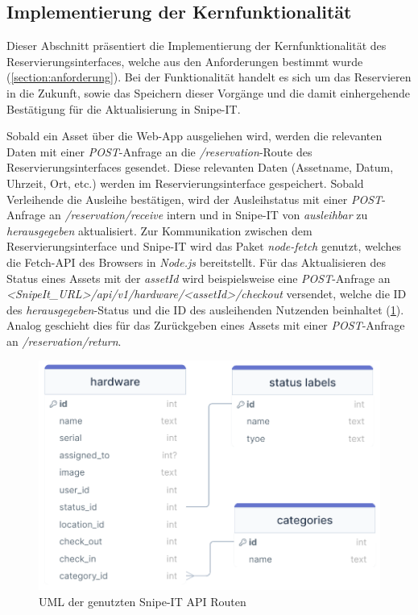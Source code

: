 \subsection{Implementierung der Kernfunktionalität}
\label{subsec:kernfkt}
Dieser Abschnitt präsentiert die Implementierung der Kernfunktionalität des
Reservierungsinterfaces, welche aus den Anforderungen bestimmt wurde (\ref{section:anforderung}).
Bei der Funktionalität handelt es sich um das Reservieren in die Zukunft, sowie das Speichern
dieser Vorgänge und die damit einhergehende Bestätigung für die Aktualisierung in Snipe-IT.


Sobald ein Asset über die Web-App ausgeliehen wird, werden die relevanten Daten mit einer
\textit{POST}-Anfrage an die \textit{/reservation}-Route des Reservierungsinterfaces gesendet.
Diese relevanten Daten (Assetname, Datum, Uhrzeit, Ort, etc.) werden im Reservierungsinterface
gespeichert. Sobald Verleihende die Ausleihe bestätigen, wird der Ausleihstatus mit einer
\textit{POST}-Anfrage an \textit{/reservation/receive} intern und in Snipe-IT von
\textit{ausleihbar} zu \textit{herausgegeben} aktualisiert. Zur Kommunikation zwischen dem
Reservierungsinterface und Snipe-IT wird das Paket \textit{node-fetch} genutzt, welches die
Fetch-API des Browsers in \textit{Node.js} bereitstellt. Für das Aktualisieren des Status eines
Assets mit der \textit{assetId} wird beispielsweise eine \textit{POST}-Anfrage an
\textit{<SnipeIt\_URL>/api/v1/hardware/<assetId>/checkout} versendet, welche die ID des
\textit{herausgegeben}-Status und die ID des ausleihenden Nutzenden beinhaltet (\ref{fig:server}).
Analog geschieht dies für das Zurückgeben eines Assets mit einer \textit{POST}-Anfrage an
\textit{/reservation/return}.
\begin{figure}[h]
  \centering
  \includegraphics[scale=0.4]{Bilder/Code/DB_RES_INT.png}
  \caption{UML der genutzten Snipe-IT API Routen}
  \label{fig:server}
\end{figure}


